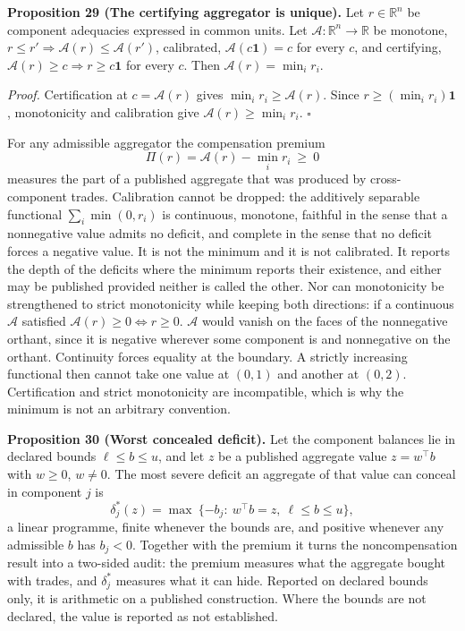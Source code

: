 \documentclass[11pt]{article}
\begin{document}
\textbf{Proposition 29 (The certifying aggregator is unique).} Let \(r\in\mathbb R^{n}\) be component adequacies expressed in common units. Let \(\mathcal A:\mathbb R^{n}\to\mathbb R\) be monotone, \(r\le r'\Rightarrow\mathcal A(r)\le\mathcal A(r')\), calibrated, \(\mathcal A(c\mathbf 1)=c\) for every \(c\), and certifying, \(\mathcal A(r)\ge c\Rightarrow r\ge c\mathbf 1\) for every \(c\). Then \(\mathcal A(r)=\min_ir_i\).

\emph{Proof.} Certification at \(c=\mathcal A(r)\) gives \(\min_ir_i\ge\mathcal A(r)\). Since
\(r\ge(\min_ir_i)\mathbf 1\), monotonicity and calibration give \(\mathcal A(r)\ge\min_ir_i\).
\ensuremath{\square}

For any admissible aggregator the compensation premium \[ \Pi(r)=\mathcal A(r)-\min_ir_i\ \ge\ 0 \] measures the part of a published aggregate that was produced by cross-component trades. Calibration cannot be dropped: the additively separable functional \(\sum_i\min(0,r_i)\) is continuous, monotone, faithful in the sense that a nonnegative value admits no deficit, and complete in the sense that no deficit forces a negative value. It is not the minimum and it is not calibrated. It reports the depth of the deficits where the minimum reports their existence, and either may be published provided neither is called the other. Nor can monotonicity be strengthened to strict monotonicity while keeping both directions: if a continuous \(\mathcal A\) satisfied \(\mathcal A(r)\ge0\Leftrightarrow r\ge0\). \(\mathcal A\) would vanish on the faces of the nonnegative orthant, since it is negative wherever some component is and nonnegative on the orthant. Continuity forces equality at the boundary. A strictly increasing functional then cannot take one value at \((0,1)\) and another at \((0,2)\). Certification and strict monotonicity are incompatible, which is why the minimum is not an arbitrary convention.

\textbf{Proposition 30 (Worst concealed deficit).} Let the component balances lie in declared bounds \(\ell\le b\le u\), and let \(z\) be a published aggregate value \(z=w^{\top}b\) with \(w\ge0\), \(w\ne0\). The most severe deficit an aggregate of that value can conceal in component \(j\) is \[ \delta^{*}_j(z)=\max\ \{-b_j:\ w^{\top}b=z,\ \ell\le b\le u\}, \] a linear programme, finite whenever the bounds are, and positive whenever any admissible \(b\) has \(b_j<0\). Together with the premium it turns the noncompensation result into a two-sided audit: the premium measures what the aggregate bought with trades, and \(\delta^{*}_j\) measures what it can hide. Reported on declared bounds only, it is arithmetic on a published construction. Where the bounds are not declared, the value is reported as not established.
\end{document}
